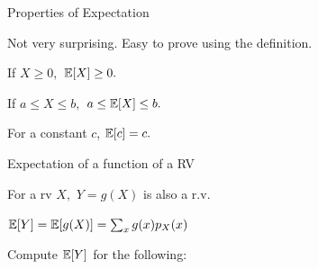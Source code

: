 \documentclass[fleqn,aspectratio=169]{beamer}
\begin{document}
\begin{frame}{Properties of Expectation}

Not very surprising. Easy to prove using the definition.

\plitemsep 0.7in
\bci [$\circ$]

\item If $X \geq 0,$ $\mathbb{E}[ X ] \geq 0.$

\item If $a \le X \le b,$ $a \le \mathbb{E}[ X ] \le b.$

\item For a constant $c$, $\mathbb{E}[ c ] = c.$
\eci 

\end{frame}

\begin{frame}{Expectation of a function of a RV}

\plitemsep 0.05in
\bci 

\item<1-> For a rv $X,$ $Y =g (X)$ is also a r.v.

\item<2-> $\mathbb{E}[ Y ] = \mathbb{E}[ g(X) ] = \sum_{x} g(x) p_X(x)$ 

\item<3-> Compute $\mathbb{E}[ Y ]$ for the following:

{
}

\eci 

\end{frame}
\end{document}
